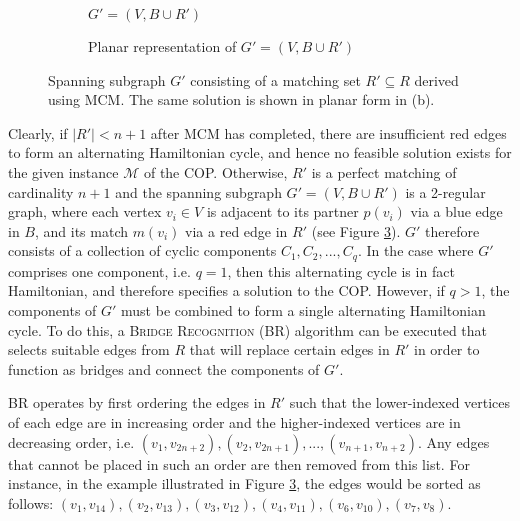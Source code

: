 \documentclass[oribibl]{llncs}
\begin{document}
\begin{figure}	
	\centering
	\begin{subfigure}[t]{0.4\textwidth}
		
		\caption{$G' = (V, B \cup R')$}	
		\label{fig:matching}
	\end{subfigure} \quad
	\begin{subfigure}[t]{0.55\textwidth}
		
		\caption{Planar representation of $G' =(V, B \cup R')$}	
		\label{fig:mps}
	\end{subfigure}
	\caption{Spanning subgraph $G'$ consisting of a matching set $R' \subseteq R$ derived using MCM. The same solution is shown in planar form in (b).}
	\label{fig:matching/mps}
\end{figure}

Clearly, if $|R'| < n+1$ after MCM has completed, there are insufficient red edges to form an alternating Hamiltonian cycle, and hence no feasible solution exists for the given instance $\mathcal{M}$ of the COP. Otherwise, $R'$ is a perfect matching of cardinality $n+1$ and the spanning subgraph $G'=(V, B \cup R')$ is a 2-regular graph, where each vertex $v_i \in V$ is adjacent to its partner $p(v_i)$ via a blue edge in $B$, and its match $m(v_i)$ via a red edge in $R'$ (see Figure \ref{fig:matching/mps}). $G'$ therefore consists of a collection of cyclic components $C_1, C_2, ..., C_q$. In the case where $G'$ comprises one component, i.e. $q = 1$, then this alternating cycle is in fact Hamiltonian, and therefore specifies a solution to the COP. However, if $q > 1$, the components of $G'$ must be combined to form a single alternating Hamiltonian cycle. To do this, a \textsc{Bridge Recognition} (BR) algorithm can be executed that selects suitable edges from $R$ that will replace certain edges in $R'$ in order to function as bridges and connect the components of $G'$.

BR operates by first ordering the edges in $R'$ such that the lower-indexed vertices of each edge are in increasing order and the higher-indexed vertices are in decreasing order, i.e. $(v_1, v_{2n+2}), (v_2, v_{2n+1}), ..., (v_{n+1}, v_{n+2})$. Any edges that cannot be placed in such an order are then removed from this list. For instance, in the example illustrated in Figure \ref{fig:matching/mps}, the edges would be sorted as follows: $(v_1, v_{14}), (v_2, v_{13}),(v_3, v_{12}),(v_4, v_{11}),(v_6, v_{10}),(v_7, v_8)$.
\end{document}
